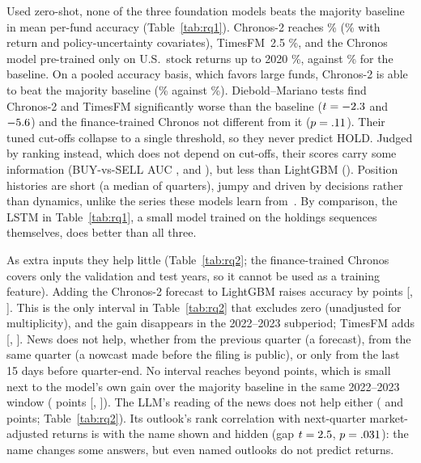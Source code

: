 Used zero-shot, none of the three foundation models beats the majority
baseline in mean per-fund accuracy (Table~\ref{tab:rq1}). Chronos-2 reaches
\chronosM\% (\chronosDM\% with return and policy-uncertainty covariates),
TimesFM~2.5 \timesfmM\%, and the Chronos model pre-trained only on U.S.\
stock returns up to 2020 \fintextM\%, against \baseM\% for the baseline. On a
pooled accuracy basis, which favors large funds, Chronos-2 is able to beat the majority
baseline (\chronospooledM\% against \basepooledM\%). Diebold--Mariano tests find Chronos-2 and TimesFM significantly worse than the
baseline ($t = -2.3$ and $-5.6$) and the finance-trained Chronos
not different from it ($p = .11$). Their tuned cut-offs collapse to a
single threshold, so they never predict HOLD. Judged by ranking
instead, which does not depend on cut-offs, their scores carry some
information (BUY-vs-SELL AUC \aucchronosM, \auctimesfmM{} and \aucfintextM),
but less than LightGBM (\auclgbM). Position histories are short (a median of
\medhistM{} quarters), jumpy and driven by decisions rather than dynamics,
unlike the series these models learn from~\cite{rahimikia2025tsfm}. By
comparison, the LSTM in Table~\ref{tab:rq1}, a small model trained on the
holdings sequences themselves, does better than all three.



As extra inputs they help little (Table~\ref{tab:rq2}; the finance-trained
Chronos covers only the validation and test years, so it cannot be used as a
training feature). Adding the Chronos-2 forecast to LightGBM raises accuracy
by \rqtwochronos{} points [\rqtwochronoslo, \rqtwochronoshi]. This is the only
interval in Table~\ref{tab:rq2} that excludes zero (unadjusted for
multiplicity), and the gain disappears in the 2022--2023 subperiod; TimesFM
adds \rqtwotimesfm{} [\rqtwotimesfmlo, \rqtwotimesfmhi]. News does not help,
whether from the previous quarter (a forecast), from the same quarter (a
nowcast made before the filing is public), or only from the last 15 days
before quarter-end. No interval reaches beyond \rqtwomaxhi{} points, which
is small next to the model's own gain over the majority baseline in the same
2022--2023 window (\newswindowgain{} points [\newswindowlo, \newswindowhi]).
The LLM's reading of the news does not help either (\rqtwollmprev{} and
\rqtwollmnow{} points; Table~\ref{tab:rq2}). Its outlook's rank correlation
with next-quarter market-adjusted returns is \llmmemnamed{} with the name
shown and \llmmemanon{} hidden (gap $t = 2.5$, $p = .031$): the
name changes some answers, but even named outlooks do not predict returns.

